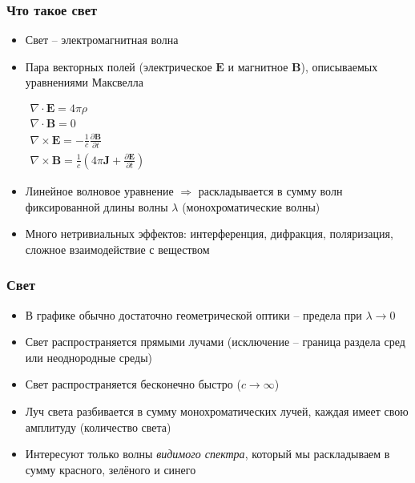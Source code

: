 \documentclass[handout,10pt]{beamer}
\begin{document}
\begin{frame}[fragile]
\frametitle{Что такое свет}
\begin{itemize}
\item Свет -- электромагнитная волна
\pause
\item Пара векторных полей (электрическое \begin{math}\mathbf{E}\end{math} и магнитное \begin{math}\mathbf{B}\end{math}), описываемых уравнениями Максвелла
\begin{center}
\begin{math}
\begin{matrix}
\nabla \cdot \mathbf{E} = 4 \pi \rho \\
\nabla \cdot \mathbf{B} = 0 \\
\nabla \times \mathbf{E} = -\frac{1}{c} \frac{\partial \mathbf B}{\partial t} \\
\nabla \times \mathbf{B} = \frac{1}{c} \left(4 \pi \mathbf J + \frac{\partial \mathbf E}{\partial t} \right)
\end{matrix}
\end{math}
\end{center}
\pause
\item Линейное волновое уравнение \begin{math}\Longrightarrow\end{math} раскладывается в сумму волн фиксированной длины волны \begin{math}\lambda\end{math} (монохроматические волны)
\pause
\item Много нетривиальных эффектов: интерференция, дифракция, поляризация, сложное взаимодействие с веществом
\end{itemize}
\end{frame}

\begin{frame}[fragile]
\frametitle{Свет}
\begin{itemize}
\item В графике обычно достаточно геометрической оптики -- предела при \begin{math}\lambda\rightarrow 0\end{math}
\pause
\item Свет распространяется прямыми лучами (исключение -- граница раздела сред или неоднородные среды)
\pause
\item Свет распространяется бесконечно быстро (\begin{math}c \rightarrow \infty\end{math})
\pause
\item Луч света разбивается в сумму монохроматических лучей, каждая имеет свою амплитуду (количество света)
\pause
\item Интересуют только волны \textit{видимого спектра}, который мы раскладываем в сумму {\color{red}красного}, {\color{green}зелёного} и {\color{blue}синего}
\end{itemize}
\end{frame}
\end{document}

